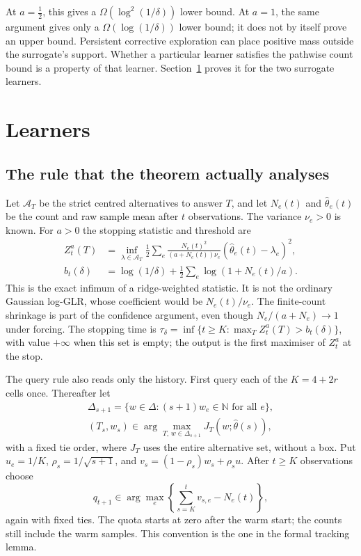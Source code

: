 At $a=\frac12$, this gives a $\Omega(\log^{2}(1/\delta))$ lower bound. At $a=1$, the
same argument gives only a $\Omega(\log(1/\delta))$ lower bound; it does not by itself
prove an upper bound. Persistent corrective exploration can place positive mass outside the
surrogate's support. Whether a particular learner satisfies the pathwise count bound is a
property of that learner. Section~\ref{sec:learners} proves it for the two surrogate learners.

\section{Learners}
\label{sec:learners}

\subsection{The rule that the theorem actually analyses}
Let $\mathcal A_T$ be the strict centred alternatives to answer $T$, and let $N_e(t)$ and
$\widehat\theta_e(t)$ be the count and raw sample mean after $t$ observations. The variance
$\nu_e>0$ is known. For $a>0$ the stopping statistic and threshold are
\begin{align}
Z_t^a(T)&=\inf_{\lambda\in\mathcal A_T}
 \frac12\sum_e\frac{N_e(t)^2}{(a+N_e(t))\nu_e}
 (\widehat\theta_e(t)-\lambda_e)^2,\label{eq:ridgestop}\\
b_t(\delta)&=\log(1/\delta)+\frac12\sum_e\log(1+N_e(t)/a).
\label{eq:idealboundary}
\end{align}
This is the exact infimum of a ridge-weighted statistic. It is not the ordinary Gaussian
log-GLR, whose coefficient would be $N_e(t)/\nu_e$. The finite-count shrinkage is part of
the confidence argument, even though $N_e/(a+N_e)\to1$ under forcing.
The stopping time is
$\tau_\delta=\inf\{t\ge K:\max_T Z_t^a(T)>b_t(\delta)\}$, with value $+\infty$ when this set
is empty; the output is the first maximiser of $Z_t^a$ at the stop.

The query rule also reads only the history. First query each of the $K=4+2r$ cells once.
Thereafter let
\begin{gather*}
\Delta_{s+1}=\{w\in\Delta:(s+1)w_e\in\mathbb N\text{ for all }e\},\\
(T_s,w_s)\in\arg\max_{T,\,w\in\Delta_{s+1}}J_T(w;\widehat\theta(s)),
\end{gather*}
with a fixed tie order, where $J_T$ uses the entire alternative set, without a box.
Put $u_e=1/K$, $\rho_s=1/\sqrt{s+1}$, and $v_s=(1-\rho_s)w_s+\rho_su$.
After $t\ge K$ observations choose
\[
q_{t+1}\in\arg\max_e\left\{\sum_{s=K}^{t}v_{s,e}-N_e(t)\right\},
\]
again with fixed ties. The quota starts at zero after the warm start; the counts still
include the warm samples. This convention is the one in the formal tracking lemma.

